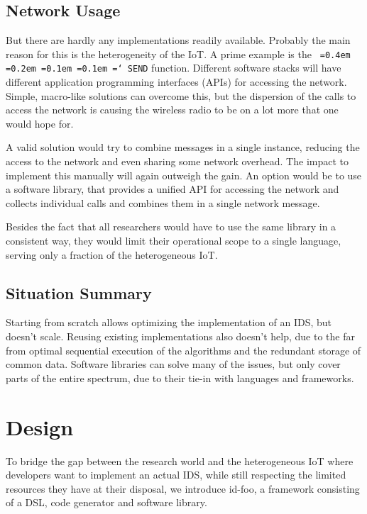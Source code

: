 \documentclass[conference]{IEEEtran}
\newcommand{\NAME}{id-foo\xspace}
\newcommand*\justify{%
  \fontdimen2\font=0.4em%
  \fontdimen3\font=0.2em%
  \fontdimen4\font=0.1em%
  \fontdimen7\font=0.1em%
  \hyphenchar\font=`\-%
}
\newcommand{\ttt}[1]{\texttt{\justify{#1}}}
\begin{document}
\subsection{Network Usage}

But there are hardly any implementations readily available. Probably the main
reason for this is the heterogeneity of the IoT. A prime example is the
\ttt{SEND} function. Different software stacks will have different application
programming interfaces (APIs) for accessing the network. Simple, macro-like
solutions can overcome this, but the dispersion of the calls to access the
network is causing the wireless radio to be on a lot more that one would hope
for.

A valid solution would try to combine messages in a single instance, reducing
the access to the network and even sharing some network overhead. The impact to
implement this manually will again outweigh the gain. An option would be to use
a software library, that provides a unified API for accessing the network and
collects individual calls and combines them in a single network message.

Besides the fact that all researchers would have to use the same library in a
consistent way, they would limit their operational scope to a single language,
serving only a fraction of the heterogeneous IoT.

\subsection{Situation Summary}

Starting from scratch allows optimizing the implementation of an IDS, but
doesn't scale. Reusing existing implementations also doesn't help, due to the
far from optimal sequential execution of the algorithms and the redundant
storage of common data. Software libraries can solve many of the issues, but
only cover parts of the entire spectrum, due to their tie-in with languages and
frameworks.

\section{Design}
\label{design}

To bridge the gap between the research world and the heterogeneous IoT where
developers want to implement an actual IDS, while still respecting the limited
resources they have at their disposal, we introduce \NAME, a framework
consisting of a DSL, code generator and software library.
\end{document}
